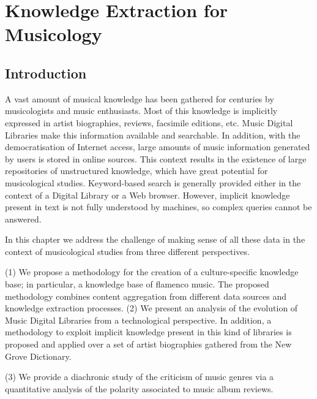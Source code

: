 
\chapter{Knowledge Extraction for Musicology}
\label{sec:musicology}

\section{Introduction}
\label{sec:musicology:introduction}

A vast amount of musical knowledge has been gathered for centuries by musicologists and music enthusiasts. Most of this knowledge is implicitly expressed in artist biographies, reviews, facsimile editions, etc. Music Digital Libraries make this information available and searchable. 
In addition, with the democratisation of Internet access, large amounts of music information generated by users is stored in online sources. This context results in the existence of large repositories of unstructured knowledge, which have great potential for musicological studies.
Keyword-based search is generally provided either in the context of a Digital Library or a Web browser. However, implicit knowledge present in text is not fully understood by machines, so complex queries cannot be answered. 

In this chapter we address the challenge of making sense of all these data in the context of musicological studies from three different perspectives. 

(1) 
We propose a methodology for the creation of a culture-specific knowledge base; in particular, a knowledge base of flamenco music. The proposed methodology combines content aggregation from different data sources and knowledge extraction processes. %
(2) 
We present an analysis of the evolution of Music Digital Libraries from a technological perspective. In addition, a methodology to exploit implicit knowledge present in this kind of libraries is proposed and applied over a set of artist biographies gathered from the New Grove Dictionary. 

(3)
We provide a diachronic study of the criticism of music genres via a quantitative analysis of the polarity associated to music album reviews. %

